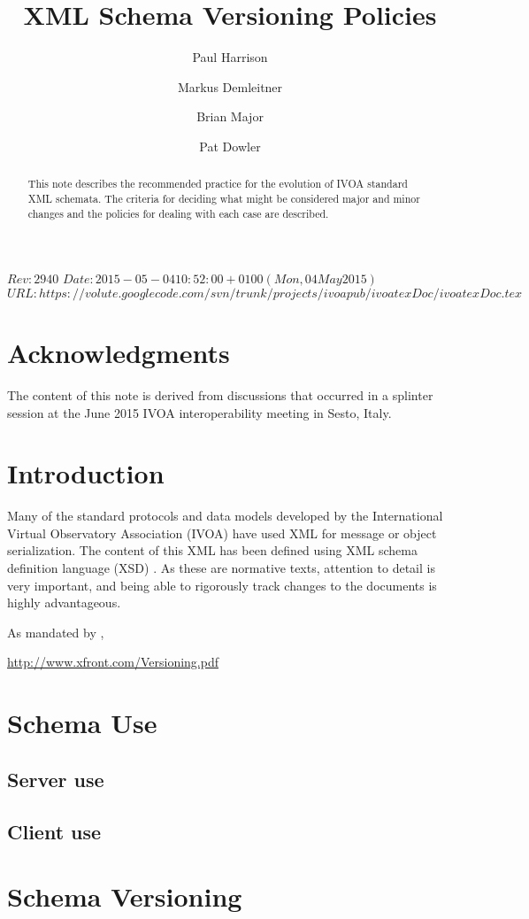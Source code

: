 \documentclass[11pt,a4paper]{ivoa}
\title{XML Schema Versioning Policies}
\author[http://www.ivoa.net/cgi-bin/twiki/bin/view/IVOA/PaulHarrison]{Paul Harrison}
\author[http://www.ivoa.net/cgi-bin/twiki/bin/view/IVOA/MarkusDemleitner]{Markus Demleitner}
\author[http://www.ivoa.net/cgi-bin/twiki/bin/view/IVOA/BrianMajor]{Brian Major}
\author[http://www.ivoa.net/cgi-bin/twiki/bin/view/IVOA/PatDowler]{Pat Dowler}
\begin{document}
\SVN$Rev: 2940 $
\SVN$Date: 2015-05-04 10:52:00 +0100 (Mon, 04 May 2015) $
\SVN$URL: https://volute.googlecode.com/svn/trunk/projects/ivoapub/ivoatexDoc/ivoatexDoc.tex $

\begin{abstract}
This note describes the recommended practice for the evolution of IVOA
standard XML schemata.  The criteria for deciding what might be considered major
and minor changes and the policies for dealing with each case are described.
\end{abstract}


\section*{Acknowledgments}

The content of this note is derived from discussions that occurred in a splinter
session at the June 2015 IVOA interoperability meeting in Sesto, Italy.

\section{Introduction}

Many of the standard protocols and data models developed by
the International Virtual Observatory Association (IVOA) have used XML
\citet{std:XML} for message or object serialization. The content of this XML has
been defined using XML schema definition language (XSD) \citet{std:XSD}.  As
these are normative texts, attention to detail is very important, and being able to rigorously track changes to the documents is highly advantageous.  


As mandated by \citet{std:docSTD}, 

\url{http://www.xfront.com/Versioning.pdf}

\section{Schema Use}
\subsection{Server use}
\subsection{Client use}
\section{Schema Versioning}
\end{document}
